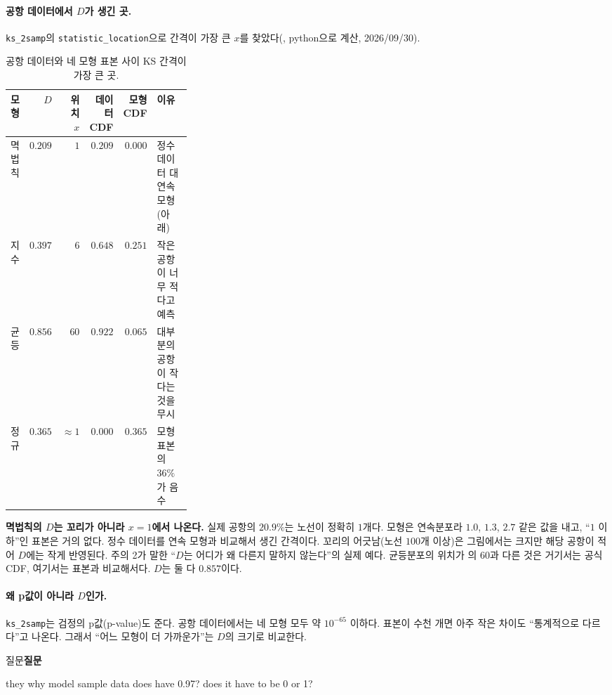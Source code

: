 \documentclass[11pt]{article}
\newenvironment{callout}[1][]
  {\par\medskip\noindent
   \begin{lrbox}{\calloutbox}\begin{minipage}{0.92\linewidth}
   \def\calloutttl{#1}\ifx\calloutttl\empty\else\textbf{#1}\par\smallskip\fi}
  {\end{minipage}\end{lrbox}%
   \fcolorbox{black!30}{black!3}{\usebox{\calloutbox}}\par\medskip}
\newcommand{\term}[1]{\textbf{#1}}
\begin{document}
\paragraph{공항 데이터에서 $D$가 생긴 곳.} \texttt{ks\_2samp}의 \texttt{statistic\_location}으로
간격이 가장 큰 $x$를 찾았다(, python으로 계산, 2026/09/30).
\begin{table}[H]
  \centering
  \caption{공항 데이터와 네 모형 표본 사이 KS 간격이 가장 큰 곳.}
  \label{tab:ks-where}
  \begin{tabular}{lrrrrp{0.3\linewidth}}
    \toprule
    모형 & $D$ & 위치 $x$ & 데이터 CDF & 모형 CDF & 이유 \\
    \midrule
    멱법칙 & $0.209$ & $1$ & $0.209$ & $0.000$ & 정수 데이터 대 연속 모형(아래) \\
    \midrule
    지수 & $0.397$ & $6$ & $0.648$ & $0.251$ & 작은 공항이 너무 적다고 예측 \\
    \midrule
    균등 & $0.856$ & $60$ & $0.922$ & $0.065$ & 대부분의 공항이 작다는 것을 무시 \\
    \midrule
    정규 & $0.365$ & $\approx 1$ & $0.000$ & $0.365$ & 모형 표본의 $36\%$가 음수 \\
    \bottomrule
  \end{tabular}
\end{table}
\term{멱법칙의 $D$는 꼬리가 아니라 $x = 1$에서 나온다.} 실제 공항의 $20.9\%$는 노선이
정확히 $1$개다. 모형은 연속분포라 $1.0$, $1.3$, $2.7$ 같은 값을 내고, ``$1$ 이하''인 표본은
거의 없다. 정수 데이터를 연속 모형과 비교해서 생긴 간격이다. 꼬리의 어긋남(노선 $100$개
이상)은 그림에서는 크지만 해당 공항이 적어 $D$에는 작게 반영된다. 주의 2가 말한
``$D$는 어디가 왜 다른지 말하지 않는다''의 실제 예다. 균등분포의 위치가
의 $60$과 다른 것은 거기서는 공식 CDF, 여기서는 표본과 비교해서다.
$D$는 둘 다 $0.857$이다.

\paragraph{왜 p값이 아니라 $D$인가.} \texttt{ks\_2samp}는 검정의 p값(p-value)도 준다.
공항 데이터에서는 네 모형 모두 약 $10^{-65}$ 이하다. 표본이 수천 개면 아주 작은 차이도
``통계적으로 다르다''고 나온다. 그래서 ``어느 모형이 더 가까운가''는 $D$의 크기로
비교한다.

\begin{callout}[질문]
they why model sample data does have 0.97? does it have to be 0 or 1?
\end{callout}
\end{document}
